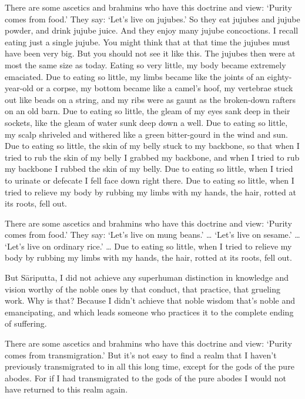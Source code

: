 \documentclass[12pt,openany]{book}%
\begin{document}
There are some ascetics and brahmins who have this doctrine and view: ‘Purity comes from food.’ They say: ‘Let’s live on jujubes.’ So they eat jujubes and jujube powder, and drink jujube juice. And they enjoy many jujube concoctions. I recall eating just a single jujube. You might think that at that time the jujubes must have been very big. But you should not see it like this. The jujubes then were at most the same size as today. Eating so very little, my body became extremely emaciated. Due to eating so little, my limbs became like the joints of an eighty-year-old or a corpse, my bottom became like a camel’s hoof, my vertebrae stuck out like beads on a string, and my ribs were as gaunt as the broken-down rafters on an old barn. Due to eating so little, the gleam of my eyes sank deep in their sockets, like the gleam of water sunk deep down a well. Due to eating so little, my scalp shriveled and withered like a green bitter-gourd in the wind and sun. Due to eating so little, the skin of my belly stuck to my backbone, so that when I tried to rub the skin of my belly I grabbed my backbone, and when I tried to rub my backbone I rubbed the skin of my belly. Due to eating so little, when I tried to urinate or defecate I fell face down right there. Due to eating so little, when I tried to relieve my body by rubbing my limbs with my hands, the hair, rotted at its roots, fell out. 

There are some ascetics and brahmins who have this doctrine and view: ‘Purity comes from food.’ They say: ‘Let’s live on mung beans.’ … ‘Let’s live on sesame.’ … ‘Let’s live on ordinary rice.’ … Due to eating so little, when I tried to relieve my body by rubbing my limbs with my hands, the hair, rotted at its roots, fell out. 

But \textsanskrit{Sāriputta}, I did not achieve any superhuman distinction in knowledge and vision worthy of the noble ones by that conduct, that practice, that grueling work. Why is that? Because I didn’t achieve that noble wisdom that’s noble and emancipating, and which leads someone who practices it to the complete ending of suffering. 

There are some ascetics and brahmins who have this doctrine and view: ‘Purity comes from transmigration.’ But it’s not easy to find a realm that I haven’t previously transmigrated to in all this long time, except for the gods of the pure abodes. For if I had transmigrated to the gods of the pure abodes I would not have returned to this realm again. 
\end{document}
